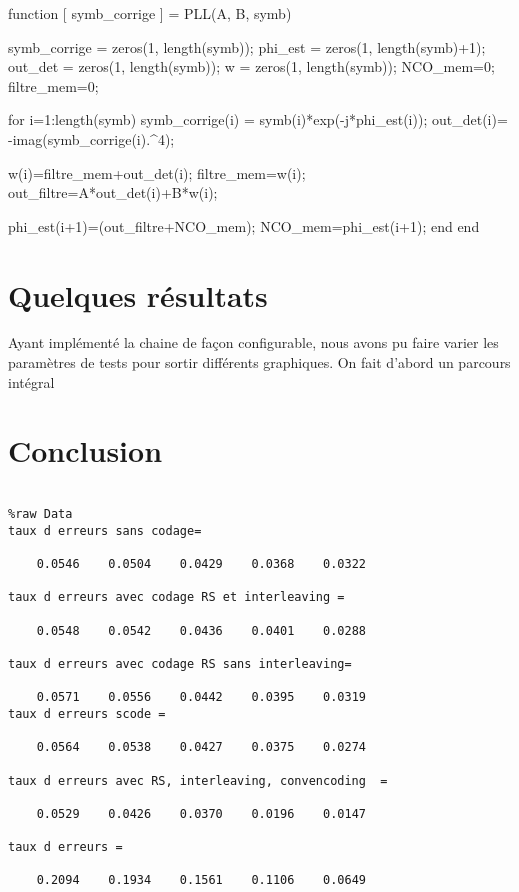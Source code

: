 \documentclass[a4paper,11pt]{article}
\begin{document}
\begin{lstun}
	function [ symb_corrige ] = PLL(A, B, symb)
	
	symb_corrige = zeros(1, length(symb));
	phi_est = zeros(1, length(symb)+1);
	out_det = zeros(1, length(symb));
	w = zeros(1, length(symb));
	NCO_mem=0;      %
	filtre_mem=0;   %
	
	for i=1:length(symb)
	symb_corrige(i) = symb(i)*exp(-j*phi_est(i));
	out_det(i)= -imag(symb_corrige(i).^4);
	
	w(i)=filtre_mem+out_det(i); %
	filtre_mem=w(i);            
	out_filtre=A*out_det(i)+B*w(i);   %
	
	phi_est(i+1)=(out_filtre+NCO_mem); %
	NCO_mem=phi_est(i+1);
	end
	end	
\end{lstun}

\section{Quelques résultats}
Ayant implémenté la chaine de façon configurable, nous avons pu faire varier les paramètres de tests pour sortir différents graphiques. 
On fait d'abord un parcours intégral 

\section{Conclusion}


\newpage

\begin{verbatim}

%raw Data
taux d erreurs sans codage=

    0.0546    0.0504    0.0429    0.0368    0.0322

taux d erreurs avec codage RS et interleaving =

    0.0548    0.0542    0.0436    0.0401    0.0288

taux d erreurs avec codage RS sans interleaving=

    0.0571    0.0556    0.0442    0.0395    0.0319
taux d erreurs scode =

    0.0564    0.0538    0.0427    0.0375    0.0274

taux d erreurs avec RS, interleaving, convencoding  =

    0.0529    0.0426    0.0370    0.0196    0.0147

taux d erreurs =

    0.2094    0.1934    0.1561    0.1106    0.0649

\end{verbatim}
\end{document}
